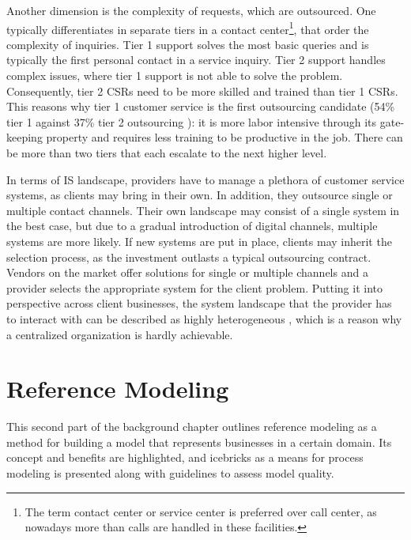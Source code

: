		Another dimension is the complexity of requests, which are outsourced. One typically differentiates in separate tiers in a contact center\footnote{The term contact center or service center is preferred over call center, as nowadays more than calls are handled in these facilities.},  that order the complexity of inquiries. Tier 1 support solves the most basic queries and is typically the first personal contact in a service inquiry. Tier 2 support handles complex issues, where tier 1 support is not able to solve the problem. Consequently, tier 2 \acrshort{CSR}s need to be more skilled and trained than tier 1  \acrshort{CSR}s. This reasons why tier 1 customer service is the first outsourcing candidate (54\% tier 1 against 37\% tier 2 outsourcing \citep{deloitte2014outsourcing}): it is more labor intensive through its gate-keeping property and requires less training to be productive in the job. There can be more than two tiers \citep{Thomas:2009} that each escalate to the next higher level.
		
		In terms of \acrshort{IS} landscape, providers have to manage a plethora of customer service systems, as clients may bring in their own. In addition, they outsource single or multiple contact channels. Their own landscape may consist of a single system in the best case, but due to a gradual introduction of digital channels, multiple systems are more likely. If new systems are put in place, clients may inherit the selection process, as the investment outlasts a typical outsourcing contract. Vendors on the market offer solutions for single or multiple channels and a provider selects the appropriate system for the client problem. Putting it into perspective across client businesses, the system landscape that the provider has to interact with can be described as highly heterogeneous \citep[]{gross2006}, which is a reason why a centralized organization is hardly achievable. 
	
	\section{Reference Modeling}
	\label{sec:03_refmod}
	This second part of the background chapter outlines reference modeling as a method for building a model that represents businesses in a certain domain. Its concept and benefits are highlighted, and icebricks as a means for process modeling is presented along with guidelines to assess model quality. 
	


